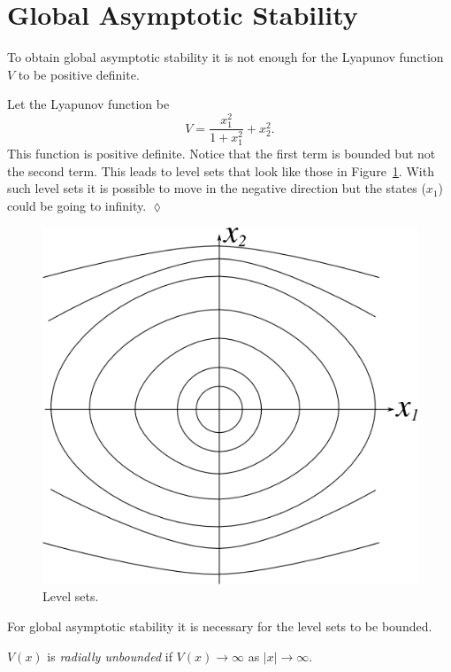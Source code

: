
\mainmatter%
\setcounter{page}{1}

\lectureseries[\course]{\course}

\date{February 4, 2010}

\setaddress%

\setcounter{lecture}{9}
\setcounter{chapter}{9}


\section{Global Asymptotic Stability}
To obtain global asymptotic stability it is not enough for the Lyapunov function $V$ to be positive definite.

\begin{example}
Let the Lyapunov function be
$$V = \frac{x_1^2}{1+x_1^2} + x_2^2.$$
This function is positive definite.
Notice that the first term is bounded but not the second term.
This leads to level sets that look like those in Figure~\ref{fig:10levelSets}.
With such level sets it is possible to move in the negative direction but the states ($x_1$) could be going to infinity.
$\lozenge$
\end{example}

\begin{figure}[ht!]
\centering
\includegraphics[width=.4\textwidth]{images/10levelSets}
\caption{Level sets.}
\label{fig:10levelSets}
\end{figure}

For global asymptotic stability it is necessary for the level sets to be bounded.

\begin{definition}
$V(x)$ is \textit{radially unbounded} if $V(x)\to\infty$ as $|x|\to\infty$.
\end{definition}

